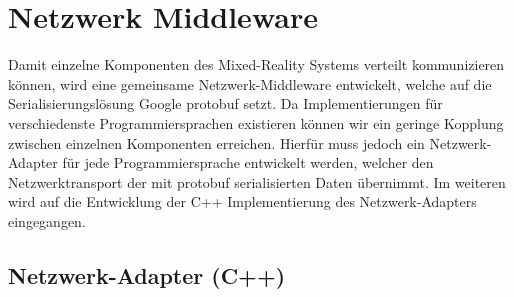 \section{Netzwerk Middleware}
Damit einzelne Komponenten des Mixed-Reality Systems verteilt kommunizieren können, wird eine gemeinsame Netzwerk-Middleware entwickelt, welche auf die Serialisierungslösung Google protobuf setzt. Da Implementierungen für verschiedenste Programmiersprachen existieren können wir ein geringe Kopplung zwischen einzelnen Komponenten erreichen. Hierfür muss jedoch ein Netzwerk-Adapter für jede Programmiersprache entwickelt werden, welcher den Netzwerktransport der mit protobuf serialisierten Daten übernimmt. Im weiteren wird auf die Entwicklung der C++ Implementierung des Netzwerk-Adapters eingegangen.
\subsection{Netzwerk-Adapter (C++)}

